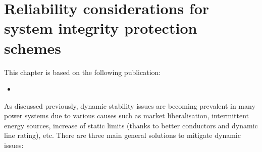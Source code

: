 \chapter{Reliability considerations for system integrity protection schemes}
\label{ch:SPS}
\minitoc




\begin{tcolorbox}[width=\linewidth, sharp corners=all,
    colback=white!80!black,
    colframe=white!80!black]
This chapter is based on the following publication:
\begin{itemize}
    \item {}
\end{itemize}
\end{tcolorbox}


As discussed previously, dynamic stability issues are becoming prevalent in many power systems due to various causes such as market liberalisation, intermittent energy sources, increase of static limits (thanks to better conductors and dynamic line rating), etc. There are three main general solutions to mitigate dynamic issues:

